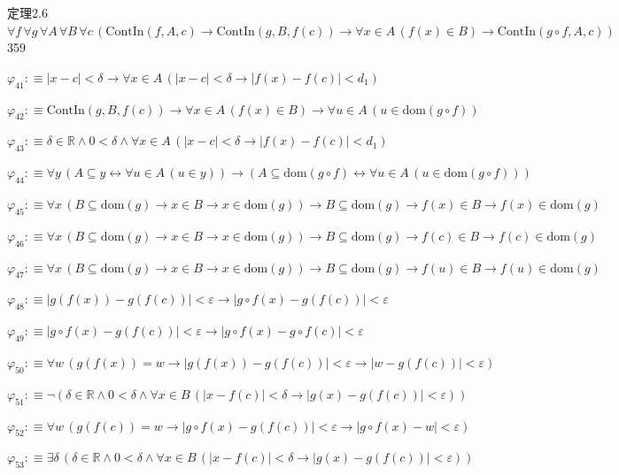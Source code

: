 \begin{fullproof}{定理2.6}{$\forall f\,\forall g\,\forall A\,\forall B\,\forall c\,(\mathrm{ContIn}(f,A,c) \to \mathrm{ContIn}(g,B,f(c)) \to \forall x \in A\,(f(x) \in B) \to \mathrm{ContIn}(g \circ f,A,c))$}{359}
\begin{abbrevlist}
\item $\varphi_{41} :\equiv \lvert x - c \rvert < \delta \to \forall x \in A\,(\lvert x - c \rvert < \delta \to \lvert f(x) - f(c) \rvert < d_{1})$
\item $\varphi_{42} :\equiv \mathrm{ContIn}(g,B,f(c)) \to \forall x \in A\,(f(x) \in B) \to \forall u \in A\,(u \in \mathrm{dom}(g \circ f))$
\item $\varphi_{43} :\equiv \delta \in \mathbb{R} \land 0 < \delta \land \forall x \in A\,(\lvert x - c \rvert < \delta \to \lvert f(x) - f(c) \rvert < d_{1})$
\item $\varphi_{44} :\equiv \forall y\,(A \subseteq y \leftrightarrow \forall u \in A\,(u \in y)) \to (A \subseteq \mathrm{dom}(g \circ f) \leftrightarrow \forall u \in A\,(u \in \mathrm{dom}(g \circ f)))$
\item $\varphi_{45} :\equiv \forall x\,(B \subseteq \mathrm{dom}(g) \to x \in B \to x \in \mathrm{dom}(g)) \to B \subseteq \mathrm{dom}(g) \to f(x) \in B \to f(x) \in \mathrm{dom}(g)$
\item $\varphi_{46} :\equiv \forall x\,(B \subseteq \mathrm{dom}(g) \to x \in B \to x \in \mathrm{dom}(g)) \to B \subseteq \mathrm{dom}(g) \to f(c) \in B \to f(c) \in \mathrm{dom}(g)$
\item $\varphi_{47} :\equiv \forall x\,(B \subseteq \mathrm{dom}(g) \to x \in B \to x \in \mathrm{dom}(g)) \to B \subseteq \mathrm{dom}(g) \to f(u) \in B \to f(u) \in \mathrm{dom}(g)$
\item $\varphi_{48} :\equiv \lvert g(f(x)) - g(f(c)) \rvert < \varepsilon \to \lvert g \circ f(x) - g(f(c)) \rvert < \varepsilon$
\item $\varphi_{49} :\equiv \lvert g \circ f(x) - g(f(c)) \rvert < \varepsilon \to \lvert g \circ f(x) - g \circ f(c) \rvert < \varepsilon$
\item $\varphi_{50} :\equiv \forall w\,(g(f(x)) = w \to \lvert g(f(x)) - g(f(c)) \rvert < \varepsilon \to \lvert w - g(f(c)) \rvert < \varepsilon)$
\item $\varphi_{51} :\equiv \neg (\delta \in \mathbb{R} \land 0 < \delta \land \forall x \in B\,(\lvert x - f(c) \rvert < \delta \to \lvert g(x) - g(f(c)) \rvert < \varepsilon))$
\item $\varphi_{52} :\equiv \forall w\,(g(f(c)) = w \to \lvert g \circ f(x) - g(f(c)) \rvert < \varepsilon \to \lvert g \circ f(x) - w \rvert < \varepsilon)$
\item $\varphi_{53} :\equiv \exists \delta\,(\delta \in \mathbb{R} \land 0 < \delta \land \forall x \in B\,(\lvert x - f(c) \rvert < \delta \to \lvert g(x) - g(f(c)) \rvert < \varepsilon))$

\end{abbrevlist}
\end{fullproof}
